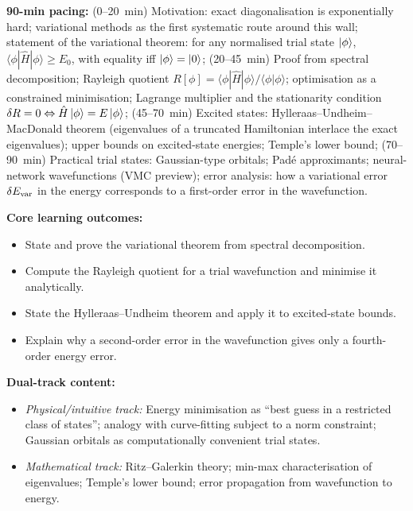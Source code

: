 \documentclass[11pt,a4paper]{article}
\begin{document}
\begin{tcolorbox}[modulebox, title={Module~II.1 / L01: The Variational Principle}]
\textbf{90-min pacing:} (0--20~min) Motivation: exact diagonalisation is exponentially hard;
variational methods as the first systematic route around this wall;
statement of the variational theorem: for any normalised trial state $\ket{\phi}$,
$\langle\phi|\hat{H}|\phi\rangle \geq E_0$, with equality iff $\ket{\phi}=\ket{0}$;
(20--45~min) Proof from spectral decomposition; Rayleigh quotient
$R[\phi]=\langle\phi|\hat{H}|\phi\rangle/\langle\phi|\phi\rangle$;
optimisation as a constrained minimisation; Lagrange multiplier and the stationarity
condition $\delta R=0 \Leftrightarrow \hat{H}\ket{\phi}=E\ket{\phi}$;
(45--70~min) Excited states: Hylleraas--Undheim--MacDonald theorem
(eigenvalues of a truncated Hamiltonian interlace the exact eigenvalues);
upper bounds on excited-state energies;
Temple's lower bound;
(70--90~min) Practical trial states: Gaussian-type orbitals;
Pad\'e approximants; neural-network wavefunctions (VMC preview);
error analysis: how a variational error $\delta E_{\rm var}$ in the energy
corresponds to a first-order error in the wavefunction.

\medskip\textbf{Core learning outcomes:}
\begin{itemize}[leftmargin=1.4em,topsep=2pt,itemsep=1pt]
  \item State and prove the variational theorem from spectral decomposition.
  \item Compute the Rayleigh quotient for a trial wavefunction and minimise it analytically.
  \item State the Hylleraas--Undheim theorem and apply it to excited-state bounds.
  \item Explain why a second-order error in the wavefunction gives only a fourth-order energy error.
\end{itemize}

\medskip\textbf{Dual-track content:}
\begin{itemize}[leftmargin=1.4em,topsep=2pt,itemsep=1pt]
  \item \textit{Physical/intuitive track:} Energy minimisation as ``best guess in a restricted
    class of states''; analogy with curve-fitting subject to a norm constraint; Gaussian
    orbitals as computationally convenient trial states.
  \item \textit{Mathematical track:} Ritz--Galerkin theory; min-max characterisation of eigenvalues;
    Temple's lower bound; error propagation from wavefunction to energy.
\end{itemize}


\end{tcolorbox}
\end{document}
